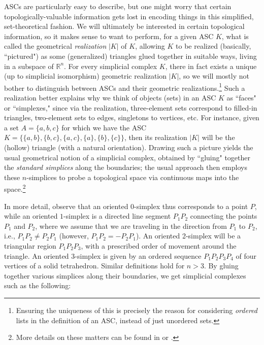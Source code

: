 \documentclass[a4paper]{book}
\theoremstyle{definition}
\theoremstyle{definition}
\theoremstyle{definition}
\theoremstyle{theorem}
\theoremstyle{definition}
\begin{document}
ASCs are particularly easy to describe, but one might worry that certain topologically-valuable information gets lost in encoding things in this simplified, set-theoretical fashion. We will ultimately be interested in certain topological information, so it makes sense to want to perform, for a given ASC $K$, what is called the geometrical \textit{realization} $|K|$ of $K$, allowing $K$ to be realized (basically, ``pictured") as some (generalized) triangles glued together in suitable ways, living in a subspace of $\mathbb{R}^n$. For every simplicial complex $K$, there in fact exists a unique (up to simplicial isomorphism) geometric realization $|K|$, so we will mostly not bother to distinguish between ASCs and their geometric realizations.\footnote{Ensuring the uniqueness of this is precisely the reason for considering \textit{ordered} lists in the definition of an ASC, instead of just unordered sets.} Such a realization better explains why we think of objects (sets) in an ASC $K$ as ``faces" or ``simplexes," since via the realization, three-element sets correspond to filled-in triangles, two-element sets to edges, singletons to vertices, etc. For instance, given a set $A = \{a,b,c\}$ for which we have the ASC $K = \{\{a,b\}, \{b,c\}, \{a,c\}, \{a\}, \{b\}, \{c\}\}$, then its realization $|K|$ will be the (hollow) triangle (with a natural orientation). Drawing such a picture yields the usual geometrical notion of a simplicial complex, obtained by ``gluing" together the \textit{standard simplices} along the boundaries; the usual approach then employs these $n$-simplices to probe a topological space via continuous maps into the space.\footnote{More details on these matters can be found in \cite{ghrist_elementary_2014} or \cite{hatcher_algebraic_2001}.} \par 
In more detail, observe that an oriented $0$-simplex thus corresponds to a point $P$, while an oriented $1$-simplex is a directed line segment $P_1P_2$ connecting the points $P_1$ and $P_2$, where we assume that we are traveling in the direction from $P_1$ to $P_2$, i.e., $P_1P_2 \neq P_2P_1$ (however, $P_1P_2 = -P_2P_1$). An oriented 2-simplex will be a triangular region $P_1P_2P_3$, with a prescribed order of movement around the triangle. An oriented $3$-simplex is given by an ordered sequence $P_1P_2P_3P_4$ of four vertices of a solid tetrahedron. Similar definitions hold for $n > 3$. By gluing together various simplices along their boundaries, we get simplicial complexes such as the following: 
\end{document}
